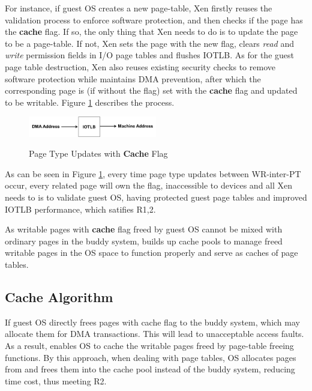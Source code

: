 For instance, if guest OS creates a new page-table, Xen firstly reuses the validation process to enforce software protection, and then checks if the page has the \textbf{cache} flag. If so, the only thing that Xen needs to do is to update the page to be a page-table. If not, Xen sets the page with the new flag, clears \emph{read} and \emph{write} permission fields in I/O page tables and flushes IOTLB. As for the guest page table destruction, Xen also reuses existing security checks to remove software protection while maintains DMA prevention, after which the corresponding page is (if without the flag) set with the \textbf{cache} flag and updated to be writable. Figure \ref{fig:cache-flag} describes the process. 

\begin{figure}[ht]
\centering
\includegraphics[width=0.5\textwidth]{image/design/cache-flag.png} \\
\caption{Page Type Updates with \textbf{Cache} Flag}
\label{fig:cache-flag}
\end{figure}

As can be seen in Figure \ref{fig:cache-flag}, every time page type updates between WR-inter-PT occur, every related page will own the flag, inaccessible to devices and all Xen needs to is to validate guest OS, having protected guest page tables and improved IOTLB performance, which satifies R1,2.  

As writable pages with \textbf{cache} flag freed by guest OS cannot be mixed with ordinary pages in the buddy system, \name builds up cache pools to manage freed writable pages in the OS space to function properly and serve as caches of page tables.

\subsection{Cache Algorithm}
If guest OS directly frees pages with cache flag to the buddy system, which may allocate them for DMA transactions. This will lead to unacceptable access faults. As a result, \name enables OS to cache the writable pages freed by page-table freeing functions. By this approach, when dealing with page tables, OS allocates pages from and frees them into the cache pool instead of the buddy system, reducing time cost, thus meeting R2.

